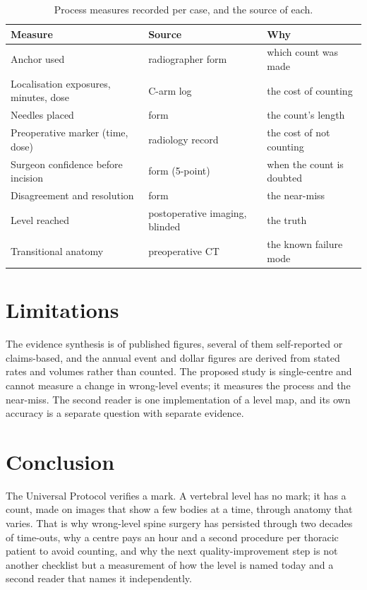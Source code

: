 \documentclass[11pt,letterpaper]{article}
\begin{document}
\begin{table}[htbp]\centering
\caption{Process measures recorded per case, and the source of each.}
\small
\begin{tabular}{p{6.5cm}p{4.2cm}p{4.5cm}}
\toprule
Measure & Source & Why \\
\midrule
Anchor used & radiographer form & which count was made \\
Localisation exposures, minutes, dose & C-arm log & the cost of counting \\
Needles placed & form & the count's length \\
Preoperative marker (time, dose) & radiology record & the cost of not counting \\
Surgeon confidence before incision & form (5-point) & when the count is doubted \\
Disagreement and resolution & form & the near-miss \\
Level reached & postoperative imaging, blinded & the truth \\
Transitional anatomy & preoperative CT & the known failure mode \\
\bottomrule
\end{tabular}
\end{table}

\section*{Limitations}
The evidence synthesis is of published figures, several of them self-reported or claims-based, and the
annual event and dollar figures are derived from stated rates and volumes rather than counted. The
proposed study is single-centre and cannot measure a change in wrong-level events; it measures the
process and the near-miss. The second reader is one implementation of a level map, and its own accuracy
is a separate question with separate evidence.

\section*{Conclusion}
The Universal Protocol verifies a mark. A vertebral level has no mark; it has a count, made on images
that show a few bodies at a time, through anatomy that varies. That is why wrong-level spine surgery
has persisted through two decades of time-outs, why a centre pays an hour and a second procedure per
thoracic patient to avoid counting, and why the next quality-improvement step is not another checklist
but a measurement of how the level is named today and a second reader that names it independently.



\end{document}
